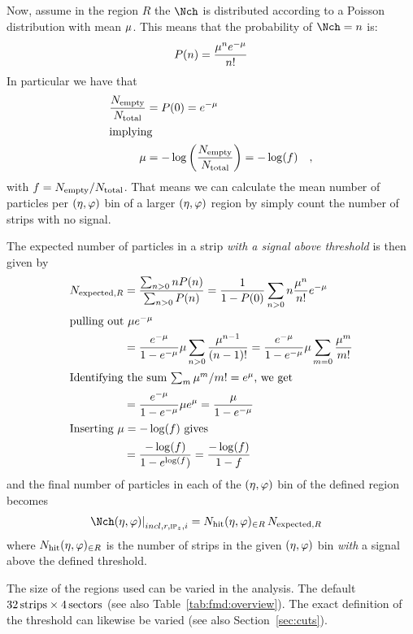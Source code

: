 \documentclass[compat,11pt]{alicenote}
\newcommand\mult[1][]{\Nch\ifx|#1|\relax\else_{#1}\fi}
\newcommand*{\etaphi}{\ensuremath(\eta,\varphi)}
\newcommand{\secref}[1]{Section~\ref{#1}}
\newcommand{\tabref}[1]{Table~\ref{#1}}
\newcommand{\dndetadphi}[1][]{{\ensuremath%
    \ifx|#1|\else\left.\fi%
      \Nch\etaphi%
      \ifx|#1|\else\right|_{#1}\fi}}
\newcommand\Ntotal{{\ensuremath N_{\text{total}}}}
\newcommand\Nempty{{\ensuremath N_{\text{empty}}}}
\newcommand\Nhit{{\ensuremath N_{\text{hit}}\etaphi_{\in R}}}
\begin{document}
Now, assume in the region $R$ the $\mult$ is distributed according to
a Poisson distribution with mean $\mu$.  This means that the
probability of $\mult=n$ is:
\begin{equation}
  P(n) = \frac{\mu^n e^{-\mu}}{n!} \label{eq:PoissonDef}
\end{equation}
In particular we have that 
\begin{align*}
  \frac{\Nempty{}}{\Ntotal{}} &=   P(0) = e^{-\muR} \\
\intertext{implying}
   \muR &= -\log\left(\frac{\Nempty{}}{\Ntotal{}}\right) = -\log(f)\quad,
\end{align*}
with $f=\Nempty{}/\Ntotal{}$.  That means we can calculate the mean
number of particles per $\etaphi$ bin of a larger $\etaphi$ region by
simply count the number of strips with no signal.

The expected number of particles in a strip \emph{with a signal above
  threshold} is then given by
\begin{align}
  N_{\text{expected},R} &= \frac{\sum_{n>0}nP(n)}{\sum_{n>0}P(n)} 
  =  \frac1{1-P(0)}\sum_{n>0}n\frac{\mu^n}{n!}e^{-\mu} \nonumber\\
  \intertext{pulling out $\mu e^{-\mu}$}\nonumber
  &= \frac{e^{-\mu}}{1-e^{-\mu}}\mu\sum_{n>0}\frac{\mu^{n-1}}{(n-1)!} 
  =
  \frac{e^{-\mu}}{1-e^{-\mu}}\mu\sum_{m=0}\frac{\mu^m}{m!}\\
  \intertext{Identifying the sum $\sum_m\mu^m/m! = e^{\mu}$, we get}\nonumber
  &= \frac{e^{-\mu}}{1-e^{-\mu}}\mu e^{\mu}  = 
  \frac{\mu}{1-e^{-\mu}}\nonumber\\
  \intertext{Inserting $\mu=-\log(f)$ gives}\nonumber
  &=
  \frac{-\log(f)}{1-e^{\log(f})}
   =  \frac{-\log(f)}{1-f}
\end{align}
and the final number of particles in each of the $\etaphi$ bin of the
defined region becomes 
\begin{align}
  \label{eq:density2}
  \dndetadphi[incl,r,\subIPz,i] &= \Nhit{}\,N_{\text{expected},R} 
\end{align}
where $\Nhit{}$ is the number of strips in the given $\etaphi$ bin
\emph{with} a signal above the defined threshold.

The size of the regions used can be varied in the analysis.  The
default $\unit[32]{strips}\times\unit[4]{sectors}$ (see also
\tabref{tab:fmd:overview}).  The exact definition of the threshold can
likewise be varied (see also \secref{sec:cuts}). 
\end{document}
